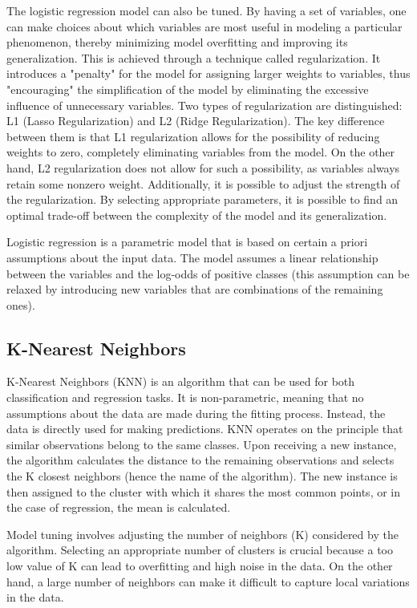 The logistic regression model can also be tuned. By having a set of variables, one can make choices about which variables are most useful in modeling a particular phenomenon, thereby minimizing model overfitting and improving its generalization. This is achieved through a technique called regularization. It introduces a "penalty" for the model for assigning larger weights to variables, thus "encouraging" the simplification of the model by eliminating the excessive influence of unnecessary variables. Two types of regularization are distinguished: L1 (Lasso Regularization) and L2 (Ridge Regularization). The key difference between them is that L1 regularization allows for the possibility of reducing weights to zero, completely eliminating variables from the model. On the other hand, L2 regularization does not allow for such a possibility, as variables always retain some nonzero weight. Additionally, it is possible to adjust the strength of the regularization. By selecting appropriate parameters, it is possible to find an optimal trade-off between the complexity of the model and its generalization.

Logistic regression is a parametric model that is based on certain a priori assumptions about the input data. The model assumes a linear relationship between the variables and the log-odds of positive classes (this assumption can be relaxed by introducing new variables that are combinations of the remaining ones).

\subsection{K-Nearest Neighbors}
K-Nearest Neighbors (KNN) is an algorithm that can be used for both classification and regression tasks. It is non-parametric, meaning that no assumptions about the data are made during the fitting process. Instead, the data is directly used for making predictions. KNN operates on the principle that similar observations belong to the same classes. Upon receiving a new instance, the algorithm calculates the distance to the remaining observations and selects the K closest neighbors (hence the name of the algorithm). The new instance is then assigned to the cluster with which it shares the most common points, or in the case of regression, the mean is calculated.

Model tuning involves adjusting the number of neighbors (K) considered by the algorithm. Selecting an appropriate number of clusters is crucial because a too low value of K can lead to overfitting and high noise in the data. On the other hand, a large number of neighbors can make it difficult to capture local variations in the data.


